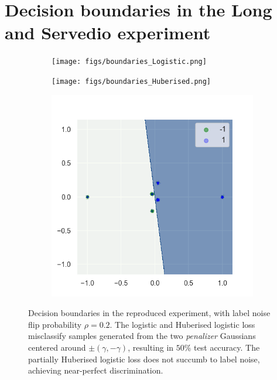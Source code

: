 \newpage
\appendix
\section{Decision boundaries in the Long and Servedio experiment}
\begin{figure}[htp]
\centering
  \begin{subfigure}{0.31\linewidth}
    \texttt{[image: figs/boundaries\_Logistic.png]}
    \label{fig:logistic}
  \end{subfigure}
  \hfill
  \begin{subfigure}{0.31\linewidth}
        \texttt{[image: figs/boundaries\_Huberised.png]}
    \label{fig:huber}
  \end{subfigure}
  \hfill
  \begin{subfigure}{0.31\linewidth}
        \includegraphics[width=\columnwidth]{figs/boundaries_Partial_Huberised.png}
    \label{fig:phuber}
  \end{subfigure}
  \caption{Decision boundaries in the reproduced \textcite{long_random_2010} experiment, with label noise flip probability $\rho = 0.2$. The logistic and Huberised logistic loss misclassify samples generated from the two \emph{penalizer} Gaussians centered around $\pm(\gamma, -\gamma)$, resulting in $50\%$ test accuracy. The partially Huberised logistic loss does not succumb to label noise, achieving near-perfect discrimination.}
  \label{fig:syntheticboundaries}
\end{figure}

